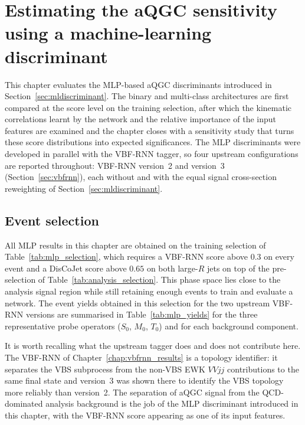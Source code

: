 \chapter{Estimating the aQGC sensitivity using a machine-learning discriminant}
\label{chap:mldiscriminant_results}

This chapter evaluates the MLP-based aQGC discriminants introduced in Section~\ref{sec:mldiscriminant}. The binary and multi-class architectures are first compared at the score level on the training selection, after which the kinematic correlations learnt by the network and the relative importance of the input features are examined and the chapter closes with a sensitivity study that turns these score distributions into expected significances. The MLP discriminants were developed in parallel with the VBF-RNN tagger, so four upstream configurations are reported throughout: VBF-RNN version~2 and version~3 (Section~\ref{sec:vbfrnn}), each without and with the equal signal cross-section reweighting of Section~\ref{sec:mldiscriminant}. 

\section{Event selection}
\label{sec:event_selection}

All MLP results in this chapter are obtained on the training selection of Table~\ref{tab:mlp_selection}, which requires a VBF-RNN score above $0.3$ on every event and a DisCoJet score above $0.65$ on both large-$R$ jets on top of the pre-selection of Table~\ref{tab:analysis_selection}. This phase space lies close to the analysis signal region while still retaining enough events to train and evaluate a network. The event yields obtained in this selection for the two upstream VBF-RNN versions are summarised in Table~\ref{tab:mlp_yields} for the three representative probe operators ($S_0$, $M_0$, $T_0$) and for each background component.

It is worth recalling what the upstream tagger does and does not contribute here. The VBF-RNN of Chapter~\ref{chap:vbfrnn_results} is a topology identifier: it separates the VBS subprocess from the non-VBS EWK $VVjj$ contributions to the same final state and version~3 was shown there to identify the VBS topology more reliably than version~2. The separation of aQGC signal from the QCD-dominated analysis background is the job of the MLP discriminant introduced in this chapter, with the VBF-RNN score appearing as one of its input features.

